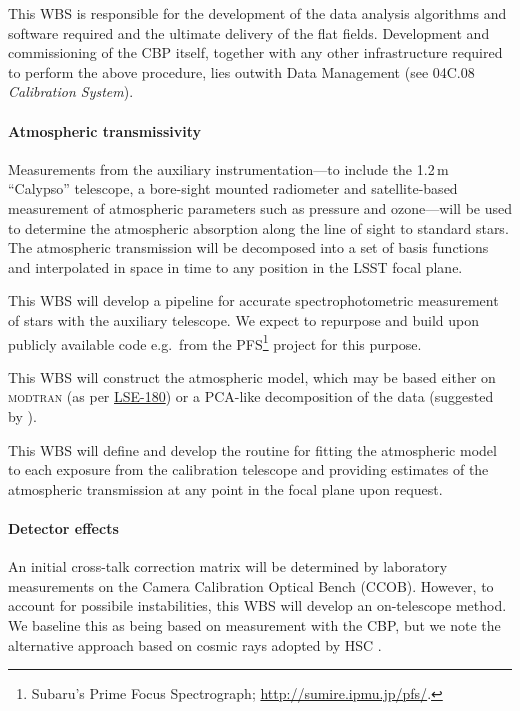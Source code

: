 \documentclass[12pt]{article}
\newcommand{\ds}[2]{{\color{blue} \href{https://docushare.lsstcorp.org/docushare/dsweb/Get/#1}{#2}}\xspace}
\newcommand{\NewPCP}{\ds{LSE-180}{LSE-180}}
\begin{document}
This WBS is responsible for the development of the data analysis algorithms and software required and the ultimate delivery of the flat fields. Development and commissioning of the CBP itself, together with any other infrastructure required to perform the above procedure, lies outwith Data Management (see 04C.08 \emph{Calibration System}).

\paragraph{Atmospheric transmissivity}

Measurements from the auxiliary instrumentation---to include the 1.2\,m ``Calypso'' telescope, a bore-sight mounted radiometer and satellite-based measurement of atmospheric parameters such as pressure and ozone---will be used to determine the atmospheric absorption along the line of sight to standard stars. The atmospheric transmission will be decomposed into a set of basis functions and interpolated in space in time to any position in the LSST focal plane.

This WBS will develop a pipeline for accurate spectrophotometric measurement of stars with the auxiliary telescope. We expect to repurpose and build upon publicly available code e.g.\ from the PFS\footnote{Subaru's Prime Focus Spectrograph; \url{http://sumire.ipmu.jp/pfs/}.} project for this purpose.

This WBS will construct the atmospheric model, which may be based either on \textsc{modtran} (as per \NewPCP{}) or a PCA-like decomposition of the data (suggested by \cite{Lupton15}).

This WBS will define and develop the routine for fitting the atmospheric model to each exposure from the calibration telescope and providing estimates of the atmospheric transmission at any point in the focal plane upon request.

\paragraph{Detector effects}

An initial cross-talk correction matrix will be determined by laboratory measurements on the Camera Calibration Optical Bench (CCOB). However, to account for possibile instabilities, this WBS will develop an on-telescope method. We baseline this as being based on measurement with the CBP, but we note the alternative approach based on cosmic rays adopted by HSC \cite{Furusawa14}.
\end{document}
